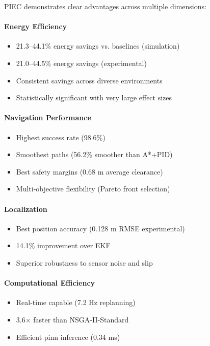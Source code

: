 PIEC demonstrates clear advantages across multiple dimensions:

\paragraph{Energy Efficiency}
\begin{itemize}
    \item 21.3--44.1\% energy savings vs. baselines (simulation)
    \item 21.0--44.5\% energy savings (experimental)
    \item Consistent savings across diverse environments
    \item Statistically significant with very large effect sizes
\end{itemize}

\paragraph{Navigation Performance}
\begin{itemize}
    \item Highest success rate (98.6\%)
    \item Smoothest paths (56.2\% smoother than A*+PID)
    \item Best safety margins (0.68 m average clearance)
    \item Multi-objective flexibility (Pareto front selection)
\end{itemize}

\paragraph{Localization}
\begin{itemize}
    \item Best position accuracy (0.128 m RMSE experimental)
    \item 14.1\% improvement over EKF
    \item Superior robustness to sensor noise and slip
\end{itemize}

\paragraph{Computational Efficiency}
\begin{itemize}
    \item Real-time capable (7.2 Hz replanning)
    \item 3.6$\times$ faster than NSGA-II-Standard
    \item Efficient \acrshort{pinn} inference (0.34 ms)
\end{itemize}

